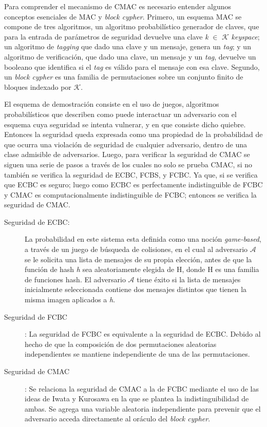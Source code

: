 \documentclass[runningheads]{llncs}
\begin{document}
Para comprender el mecanismo de CMAC es necesario entender algunos conceptos esenciales de MAC y \textit{block cypher}. Primero, un esquema MAC se compone de tres algoritmos, un algoritmo probabilístico generador de claves, que para la entrada de parámetros de seguridad devuelve una clave \textit{k} $\in$ $\mathcal{K}$ \textit{keyspace}; un algoritmo de \textit{tagging} que dado una clave y un mensaje, genera un \textit{tag}; y un algoritmo de verificación, que dado una clave, un mensaje y un \textit{tag}, devuelve un booleano que identifica si el \textit{tag} es válido para el mensaje con esa clave. Segundo, un \textit{block cypher} es una familia de permutaciones sobre un conjunto finito de bloques indexado por $\mathcal{K}$.

El esquema de demostración consiste en el uso de juegos, algoritmos probabilísticos que describen como puede interactuar un adversario con el esquema cuya seguridad se intenta vulnerar, y en que consiste dicho quiebre. Entonces la seguridad queda expresada como una propiedad de la probabilidad de que ocurra una violación de seguridad de cualquier adversario, dentro de una clase admisible de adversarios. Luego, para verificar la seguridad de CMAC se siguen una serie de pasos a través de los cuales no solo se prueba CMAC, si no también se verifica la seguridad de ECBC, FCBS, y FCBC. Ya que, si se verifica que ECBC es seguro; luego como ECBC es perfectamente indistinguible de FCBC y CMAC es computacionalmente indistinguible de FCBC; entonces se verifica la seguridad de CMAC.

\begin{description}
\item[Seguridad de ECBC:] La probabilidad en este sistema esta definida como una noción \textit{game-based}, a través de un juego de búsqueda de colisiones, en el cual al adversario $\mathcal{A}$ se le solicita una lista de mensajes de su propia elección, antes de que la función de hash \textit{h} sea aleatoriamente elegida de H, donde H es una familia de funciones hash. El adversario $\mathcal{A}$ tiene éxito si la lista de mensajes inicialmente seleccionada contiene dos mensajes distintos que tienen la misma imagen aplicados a \textit{h}.

\item[Seguridad de FCBC]: La seguridad de FCBC es equivalente a la seguridad de ECBC. Debido al hecho de que la composición de dos permutaciones aleatorias independientes se mantiene independiente de una de las permutaciones.

\item[Seguridad de CMAC]: Se relaciona la seguridad de CMAC a la de FCBC mediante el uso de las ideas de Iwata y Kurosawa en la que se plantea la indistinguibilidad de ambas. Se agrega una variable aleatoria independiente para prevenir que el adversario acceda directamente al oráculo del \textit{block cypher}.
\end{description}
\end{document}
